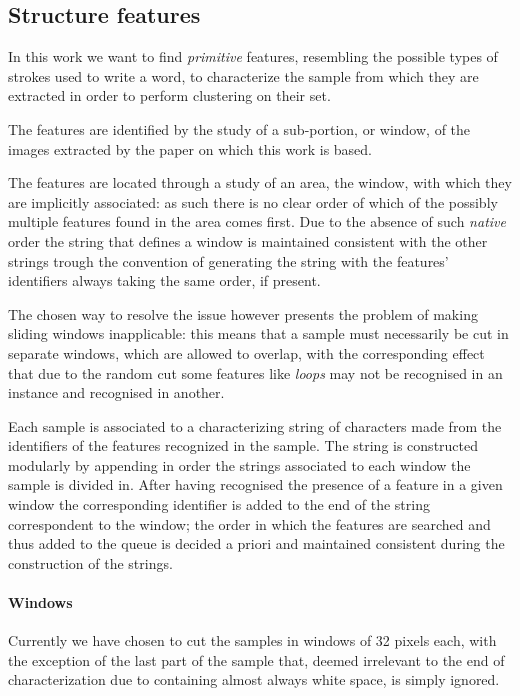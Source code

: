 \subsection{Structure features}

In this work we want to find \emph{primitive} features, resembling the possible types of strokes used to write a word, to characterize the sample from which they are extracted in order to perform clustering on their set.

The features are identified by the study of a sub-portion, or window, of the images extracted by the paper on which this work is based.

The features are located through a study of an area, the window, with which they are implicitly associated: as such there is no clear order of which of the possibly multiple features found in the area comes first.
Due to the absence of such \emph{native} order the string that defines a window is maintained consistent with the other strings trough the convention of generating the string with the features' identifiers always taking the same order, if present.

The chosen way to resolve the issue however presents the problem of making sliding windows inapplicable: this means that a sample must necessarily be cut in separate windows, which are allowed to overlap, with the corresponding effect that due to the random cut some features like \textit{loops} may not be recognised in an instance and recognised in another. 

Each sample is associated to a characterizing string of characters made from the identifiers of the features recognized in the sample.
The string is constructed modularly by appending in order the strings associated to each window the sample is divided in.
After having recognised the presence of a feature in a given window the corresponding identifier is added to the end of the string correspondent to the window; the order in which the features are searched and thus added to the queue is decided a priori and maintained consistent during the construction of the strings. 


\paragraph{Windows}

Currently we have chosen to cut the samples in windows of 32 pixels each, with the exception of the last part of the sample that, deemed irrelevant to the end of characterization due to containing almost always white space, is simply ignored.

